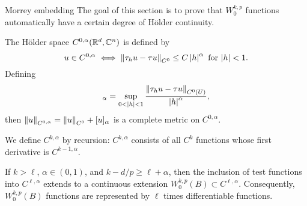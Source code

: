 \begin{clear}{Morrey embedding}
  The goal of this section is to prove that $W^{k,p}_{0}$ functions automatically have a certain degree of H\"older continuity.

  \begin{defn}
    The H\"older space $C^{0,\alpha}(\mathbb{R}^{d},\mathbb{C}^{n})$ is defined by
    \begin{equation*}
      u\in C^{0,\alpha}\iff \left\lVert\tau_{h}u-\tau u\right\rVert_{C^{0}}\le C\left|h\right|^{\alpha}\text{ for $\left|h\right|<1$}.
    \end{equation*}
    Defining
    \begin{equation*}
      [u]_{\alpha}=\sup_{0<\abs{h}<1}\frac{\norm{\tau_{h}u-\tau u}_{C^{0}(U)}}{\abs{h}^{\alpha}},
    \end{equation*}
    then $\left\lVert u\right\rVert_{C^{0,\alpha}}=\left\lVert u\right\rVert_{C^{0}}+[u]_{\alpha}$ is a complete metric on $C^{0,\alpha}$.

    We define $C^{k,\alpha}$ by recursion: $C^{k,\alpha}$ consists of all $C^{k}$ functions whose first derivative is $C^{k-1,\alpha}$.
  \end{defn}
\end{clear}
\begin{thm}
  If $k>\ell$, $\alpha\in (0,1)$, and $k-d/p\ge \ell+\alpha$, then the inclusion of test functions into $C^{\ell,\alpha}$ extends to a continuous extension $W^{k,p}_{0}(B)\subset C^{\ell,\alpha}$. Consequently, $W^{k,p}_{0}(B)$ functions are represented by $\ell$ times differentiable functions.  
\end{thm}
